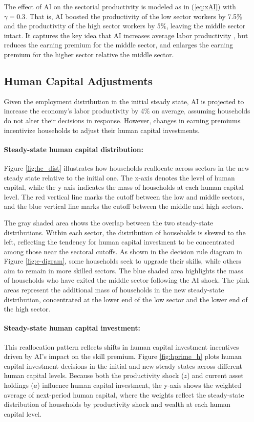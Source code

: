 \documentclass[12pt]{article}
\begin{document}
The effect of AI on the sectorial productivity is modeled as in (\ref{eq:xAI}) with $\gamma=0.3$. That is, AI boosted the productivity of the low sector workers by 7.5\% and the productivity of the high sector workers by 5\%, leaving the middle sector intact. It captures the key idea that AI increases average labor productivity \parencites{Acemoglu2019a}, but reduces the earning premium for the middle sector, and enlarges the earning premium for the higher sector relative the middle sector. 



\subsection{Human Capital Adjustments}
Given the employment distribution in the initial steady state, AI is projected to increase the economy's labor productivity by 4\% on average, assuming households do not alter their decisions in response. However, changes in earning premiums incentivize households to adjust their human capital investments. 

\paragraph{Steady-state human capital distribution:}
Figure \ref{fig:hc_dist} illustrates how households reallocate across sectors in the new steady state relative to the initial one. The x-axis denotes the level of human capital, while the y-axis indicates the mass of households at each human capital level. The red vertical line marks the cutoff between the low and middle sectors, and the blue vertical line marks the cutoff between the middle and high sectors.

The gray shaded area shows the overlap between the two steady-state distributions. Within each sector, the distribution of households is skewed to the left, reflecting the tendency for human capital investment to be concentrated among those near the sectoral cutoffs. As shown in the decision rule diagram in Figure \ref{fig:e-digram}, some households seek to upgrade their skills, while others aim to remain in more skilled sectors. The blue shaded area highlights the mass of households who have exited the middle sector following the AI shock. The pink areas represent the additional mass of households in the new steady-state distribution, concentrated at the lower end of the low sector and the lower end of the high sector.

\paragraph{Steady-state human capital investment:}
This reallocation pattern reflects shifts in human capital investment incentives driven by AI’s impact on the skill premium. Figure \ref{fig:hprime_h} plots human capital investment decisions in the initial and new steady states across different human capital levels. Because both the productivity shock ($z$) and current asset holdings ($a$) influence human capital investment, the y-axis shows the weighted average of next-period human capital, where the weights reflect the steady-state distribution of households by productivity shock and wealth at each human capital level. 
\end{document}
